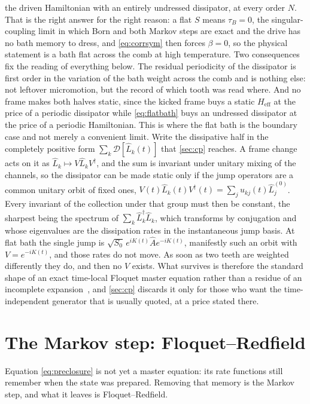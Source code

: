 \documentclass[a4paper,11pt]{article}
\newcommand{\Dcal}{\mathcal{D}}
\newcommand{\eff}{\mathrm{eff}}
\begin{document}
the driven Hamiltonian with an entirely undressed dissipator, at every order $N$. That is the right answer for the right reason: a flat $S$ means $\tau_B = 0$, the singular-coupling limit in which Born and both Markov steps are exact and the drive has no bath memory to dress, and \eqref{eq:corrsym} then forces $\beta = 0$, so the physical statement is a bath flat across the comb at high temperature. Two consequences fix the reading of everything below. The residual periodicity of the dissipator is first order in the variation of the bath weight across the comb and is nothing else: not leftover micromotion, but the record of which tooth was read where. And no frame makes both halves static, since the kicked frame buys a static $H_\eff$ at the price of a periodic dissipator while \eqref{eq:flatbath} buys an undressed dissipator at the price of a periodic Hamiltonian. This is where the flat bath is the boundary case and not merely a convenient limit. Write the dissipative half in the completely positive form $\sum_k\Dcal[\hat L_k(t)]$ that \cref{sec:cp} reaches. A frame change acts on it as $\hat L_k\mapsto V\hat L_k V^\dagger$, and the sum is invariant under unitary mixing of the channels, so the dissipator can be made static only if the jump operators are a common unitary orbit of fixed ones, $V(t)\hat L_k(t)V^\dagger(t) = \sum_j u_{kj}(t)\hat L^{(0)}_j$. Every invariant of the collection under that group must then be constant, the sharpest being the spectrum of $\sum_k\hat L^\dagger_k\hat L_k$, which transforms by conjugation and whose eigenvalues are the dissipation rates in the instantaneous jump basis. At flat bath the single jump is $\sqrt{S_0}\,e^{iK(t)}\hat A e^{-iK(t)}$, manifestly such an orbit with $V = e^{-iK(t)}$, and those rates do not move. As soon as two teeth are weighted differently they do, and then no $V$ exists. What survives is therefore the standard shape of an exact time-local Floquet master equation rather than a residue of an incomplete expansion~\cite{Nathan2020Universal,Mickiewicz2026}, and \cref{sec:cp} discards it only for those who want the time-independent generator that is usually quoted, at a price stated there.

\section{The Markov step: Floquet--Redfield}\label{sec:redfield}

Equation \eqref{eq:preclosure} is not yet a master equation: its rate functions still remember when the state was prepared. Removing that memory is the Markov step, and what it leaves is Floquet--Redfield.
\end{document}
